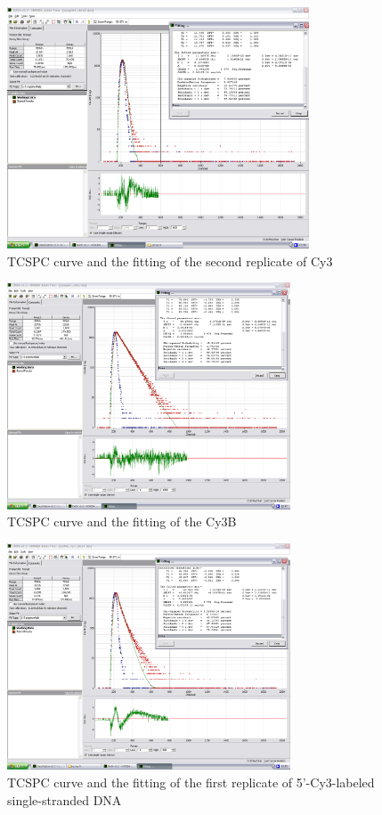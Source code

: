 \documentclass[a4paper,english,12pt,bibliography=totoc]{scrreprt}
\begin{document}
\begin{figure}
    \centering
    \includegraphics[width=0.8\textwidth]{images/dyes/Cy3_data2_fit1.png}
    \caption{TCSPC curve and the fitting of the second replicate of Cy3}
    \label{Cy3_data2_fit1}
\end{figure}

\begin{figure}
    \centering
    \includegraphics[width=0.75\textwidth]{images/dyes/Cy3B_fit1.png}
    \caption{TCSPC curve and the fitting of the Cy3B}
    \label{Cy3B_data1_fit1}
\end{figure}

\begin{figure}
    \centering
    \includegraphics[width=0.75\textwidth]{images/ssDNA/ssDNA_Cy3_data1_fit1.png}
    \caption{TCSPC curve and the fitting of the first replicate of 5'-Cy3-labeled single-stranded DNA}
    \label{ssDNA_Cy3_data1_fit1}
\end{figure}
\end{document}
